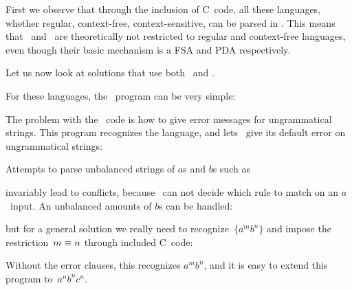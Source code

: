 First we observe that through the inclusion of C~code, all these
languages, whether regular, context-free, context-sensitive, can be
parsed in \lex. This means that \lex\ and \yacc\ are theoretically not
restricted to regular and context-free languages, even though their
basic mechanism is a FSA and PDA respectively.

Let us now look at solutions that use both \lex\ and \yacc.

For these languages, the \lex\ program can be very simple:

The problem with the \yacc\ code is how to give error messages for
ungrammatical strings. This program recognizes the language, and lets
\yacc\ give its default error on ungrammatical strings:

Attempts to parse unbalanced strings of $a$s and $b$s such as

invariably lead to conflicts, because \yacc\ can not decide which rule
to match on an $a$~input. An unbalanced amounts of $b$s can be
handled:

but for a general solution we really need to recognize~$\{a^mb^n\}$
and impose the restriction~$m\equiv\nobreak n$ through included
C~code:

Without the error clauses, this recognizes $a^mb^n$, and it is easy to
extend this program to~$a^nb^nc^n$.

